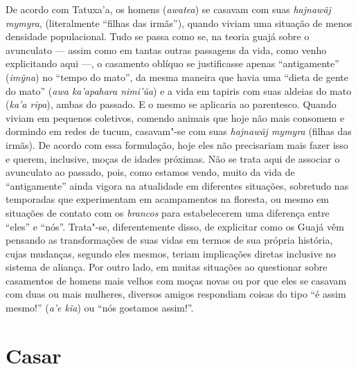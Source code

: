 De acordo com Tatuxa'a, os homens (\emph{awatea}) se casavam com suas
\emph{hajnawãj mymyra}, (literalmente ``filhas das irmãs''), quando
viviam uma situação de menos densidade populacional. Tudo se passa como
se, na teoria guajá sobre o avunculato --- assim como em tantas outras
passagens da vida, como venho explicitando aqui ---, o casamento oblíquo
se justificasse apenas ``antigamente'' (\emph{imỹna}) no ``tempo do mato'',
da mesma maneira que havia uma ``dieta de gente do mato'' (\emph{awa
ka'apahara nimi'ũa}) e a vida em tapiris com suas aldeias do mato
(\emph{ka'a ripa}), ambas do passado. E o mesmo se aplicaria ao
parentesco. Quando viviam em pequenos coletivos, comendo animais que
hoje não mais consomem e dormindo em redes de tucum, casavam"-se com suas
\emph{hajnawãj mymyra} (filhas das irmãs). De acordo com essa
formulação, hoje eles não precisariam mais fazer isso e querem,
inclusive, moças de idades próximas. Não se trata aqui de associar o
avunculato ao passado, pois, como estamos vendo, muito da vida de
``antigamente'' ainda vigora na atualidade em diferentes situações,
sobretudo nas temporadas que experimentam em acampamentos na floresta,
ou mesmo em situações de contato com os \emph{brancos} para
estabelecerem uma diferença entre ``eles'' e ``nós''. Trata"-se,
diferentemente disso, de explicitar como os Guajá vêm pensando as
transformações de suas vidas em termos de sua própria história, cujas
mudanças, segundo eles mesmos, teriam implicações diretas inclusive no
sistema de aliança. Por outro lado, em muitas situações ao questionar
sobre casamentos de homens mais velhos com moças novas ou por que eles
se casavam com duas ou mais mulheres, diversos amigos respondiam coisas
do tipo ``é assim mesmo!'' (\emph{a'e kĩa}) ou ``nós gostamos assim!''.

\section{Casar}\label{casar}

